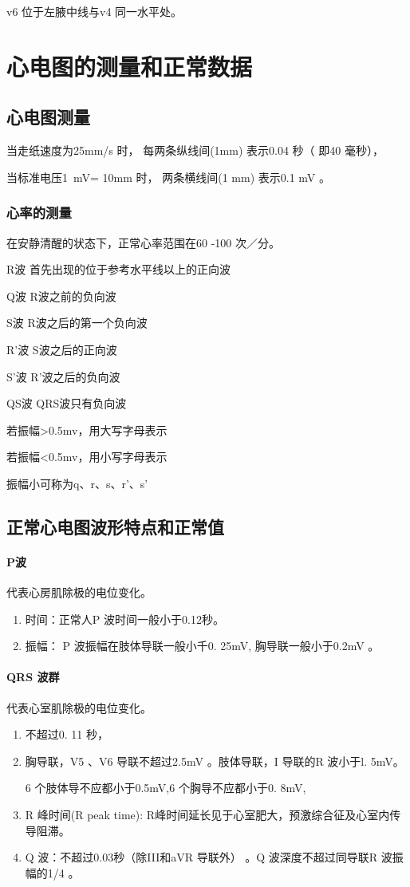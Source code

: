 \documentclass[UTF8]{ctexbook}
\begin{document}
v6 位于左腋中线与v4 同一水平处。
\section{心电图的测量和正常数据}
\subsection{心电图测量}

当走纸速度为25mm/s 时， 每两条纵线间(1mm) 表示0.04 秒（ 即40 毫秒），

当标准电压\SI{1}{mV}= 10mm 时， 两条横线间(1 mm) 表示0.1 mV 。

\subsubsection{心率的测量}
在安静清醒的状态下，正常心率范围在60 -100 次／分。

R波  首先出现的位于参考水平线以上的正向波

Q波  R波之前的负向波

S波   R波之后的第一个负向波

R’波  S波之后的正向波

S’波   R’波之后的负向波

QS波    QRS波只有负向波

若振幅>0.5mv，用大写字母表示

若振幅<0.5mv，用小写字母表示

振幅小可称为q、r、s、r’、s’

\subsection{正常心电图波形特点和正常值}
\paragraph{P波}代表心房肌除极的电位变化。
\begin{enumerate}[(1)]
    \item 时间：正常人P 波时间一般小于0.12秒。
    \item 振幅： P 波振幅在肢体导联一般小千0. 25mV, 胸导联一般小于0.2mV 。
\end{enumerate}
\paragraph{QRS 波群}代表心室肌除极的电位变化。
\begin{enumerate}[(1)]
    \item 不超过0. 11 秒，
    \item 胸导联，V5 、V6 导联不超过2.5mV 。肢体导联，I 导联的R 波小于l. 5mV。

          6 个肢体导不应都小于0.5mV,6 个胸导不应都小于0. 8mV,
    \item R 峰时间(R peak time): R峰时间延长见于心室肥大，预激综合征及心室内传导阻滞。
    \item Q 波：不超过0.03秒（除III和aVR 导联外） 。Q 波深度不超过同导联R 波振幅的1/4 。
\end{enumerate}
\end{document}
